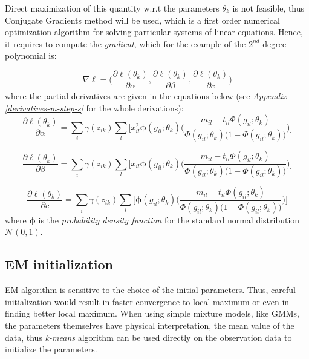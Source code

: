 Direct maximization of this quantity w.r.t the parameters $\theta_{k}$ is not feasible, thus Conjugate Gradients method \citep{Hestenes1952} will be used, which is a first order numerical optimization algorithm for solving particular systems of linear equations. Hence, it requires to compute the \emph{gradient}, which for the example of the $2^{nd}$ degree polynomial is:

\begin{equation} \label{gradient-f}
	\nabla\ell = \bigg( \frac{\partial \ell(\theta_{k})}{\partial \alpha}, \frac{\partial \ell(\theta_{k})}{\partial \beta}, \frac{\partial \ell(\theta_{k})}{\partial c}\bigg) 
\end{equation}
where the partial derivatives are given in the equations below (see \emph{Appendix \ref{derivatives-m-step-s}} for the whole derivations):
\begin{equation} \label{derivative-a-f}
	\frac{\partial \ell(\theta_{k})}{\partial \alpha} =  \sum_{i}  \gamma(z_{ik}) \sum_{l} \bigg[ x_{il}^{2} \mathbf{\phi}(g_{il};\theta_{k})\bigg(\frac{m_{il} - t_{il}\Phi(g_{il};\theta_{k})}{\Phi(g_{il};\theta_{k})\big(1-\Phi(g_{il};\theta_{k})\big)} \bigg) \bigg]
\end{equation}

\begin{equation} \label{derivative-b-f}
	\frac{\partial \ell(\theta_{k})}{\partial \beta} =  \sum_{i}  \gamma(z_{ik}) \sum_{l} \bigg[ x_{il} \mathbf{\phi}(g_{il};\theta_{k})\bigg(\frac{m_{il} - t_{il}\Phi(g_{il};\theta_{k})}{\Phi(g_{il};\theta_{k})\big(1-\Phi(g_{il};\theta_{k})\big)} \bigg) \bigg]
\end{equation}

\begin{equation} \label{derivative-c-f}
	\frac{\partial \ell(\theta_{k})}{\partial c} =  \sum_{i}  \gamma(z_{ik}) \sum_{l} \bigg[ \mathbf{\phi}(g_{il};\theta_{k})\bigg(\frac{m_{il} - t_{il}\Phi(g_{il};\theta_{k})}{\Phi(g_{il};\theta_{k})\big(1-\Phi(g_{il};\theta_{k})\big)} \bigg) \bigg]
\end{equation}
where $\mathbf{\phi}$ is the \emph{probability density function} for the standard normal distribution $\mathcal{N}(0,1)$.

\subsection{EM initialization}
EM algorithm is sensitive to the choice of the initial parameters. Thus, careful initialization would result in faster convergence to local maximum or even in finding better local maximum. When using simple mixture models, like GMMs, the parameters themselves have physical interpretation, \eg the mean value of the data, thus \emph{k-means} algorithm can be used directly on the observation data to initialize the parameters.

